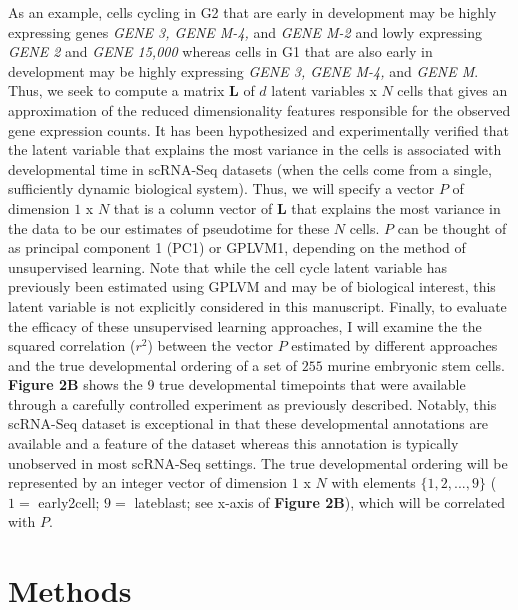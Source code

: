 \documentclass[english, 11pt]{article}\usepackage[]{graphicx}\usepackage[]{color}
\begin{document}
\noindent As an example, cells cycling in G2 that are early in development may be highly expressing genes \textit{GENE 3, GENE M-4,} and \textit{ GENE M-2} and lowly expressing \textit{GENE 2} and \textit{GENE 15,000} whereas cells in G1 that are also early in development may be highly expressing \textit{GENE 3, GENE M-4,} and \textit{GENE M}. Thus, we seek to compute a matrix $\mathbf{L}$ of $d$ latent variables x $N$ cells that gives an approximation of the reduced dimensionality features responsible for the observed gene expression counts. It has been hypothesized \cite{cannoodt2016computational} and experimentally verified \cite{lonnberg2017single} that the latent variable that explains the most variance in the cells is associated with developmental time in scRNA-Seq datasets (when the cells come from a single, sufficiently dynamic biological system). Thus, we will specify a vector $P$ of dimension $1$ x $N$ that is a column vector of $\mathbf{L}$ that explains the most variance in the data to be our estimates of pseudotime for these $N$ cells. $P$ can be thought of as principal component 1 (PC1) or GPLVM1, depending on the method of unsupervised learning. Note that while the cell cycle latent variable has previously been estimated using GPLVM \cite{buettner2015computational} and may be of biological interest, this latent variable is not explicitly considered in this manuscript.  \newline\newline
Finally, to evaluate the efficacy of these unsupervised learning approaches, I will examine the the squared correlation ($r^2$) between the vector $P$ estimated by different approaches and the true developmental ordering of a set of $255$ murine embryonic stem cells. \textbf{Figure 2B} shows the 9 true developmental timepoints that were available through a carefully controlled experiment as previously described. \cite{deng2014single} Notably, this scRNA-Seq dataset is exceptional in that these developmental annotations are available and a feature of the dataset whereas this annotation is typically unobserved in most scRNA-Seq settings. The true developmental ordering will be represented by an integer vector of dimension $1$ x $N$ with elements $\{ 1, 2, ..., 9\}$ ($1 = $ early2cell; $9 =$ lateblast; see x-axis of \textbf{Figure 2B}), which will be correlated with $P$. 


\section{Methods}
\end{document}

